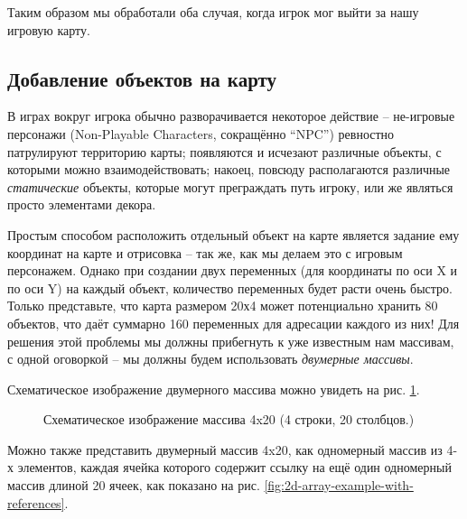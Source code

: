 \documentclass[../sparc.tex]{subfiles}
\begin{document}
Таким образом мы обработали оба случая, когда игрок мог выйти за нашу игровую
карту.

\subsection{Добавление объектов на карту}

В играх вокруг игрока обычно разворачивается некоторое действие -- не-игровые
персонажи (Non-Playable Characters, сокращённо ``NPC'') ревностно патрулируют
территорию карты; появляются и исчезают различные объекты, с которыми можно
взаимодействовать; накоец, повсюду располагаются различные \emph{статические}
объекты, которые могут преграждать путь игроку, или же являться просто
элементами декора.

Простым способом расположить отдельный объект на карте является задание ему
координат на карте и отрисовка -- так же, как мы делаем это с игровым
персонажем.  Однако при создании двух переменных (для координаты по оси X и по
оси Y) на каждый объект, количество переменных будет расти очень быстро.  Только
представьте, что карта размером 20х4 может потенциально хранить 80 объектов, что
даёт суммарно 160 переменных для адресации каждого из них!  Для решения этой
проблемы мы должны прибегнуть к уже известным нам массивам, с одной оговоркой --
мы должны будем использовать \emph{двумерные массивы}.

Схематическое изображение двумерного массива можно увидеть на
рис. \ref{fig:2d-array-example}.

\begin{figure}[ht]
  \centering
  \caption{Схематическое изображение массива 4x20 (4 строки, 20 столбцов.)}
  \label{fig:2d-array-example}
\end{figure}

Можно также представить двумерный массив 4x20, как одномерный массив из 4-х
элементов, каждая ячейка которого содержит ссылку на ещё один одномерный массив
длиной 20 ячеек, как показано на
рис. \ref{fig:2d-array-example-with-references}.
\end{document}
